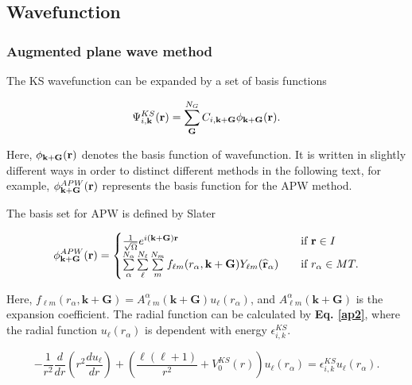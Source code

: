 \documentclass[a4paper, 12pt, titlepage,oneside,drop]{kthesis}
\begin{document}
\subsection{Wavefunction}
\subsubsection{Augmented plane wave method}

The KS wavefunction can be expanded by a set of basis functions 

\begin{equation}\label{wavefunctions}
 \Psi^{KS}_{i,\textbf{k}}(\textbf{r}) = \sum\limits_{\textbf{G}}^{N_G} C_{i,\textbf{k}+\textbf{G}}\phi_{\textbf {k}+\textbf{G}} ({\textbf r}).
\end{equation}

Here, $\phi_{\textbf {k}+\textbf{G}} ({\textbf r})$ denotes the basis function of wavefunction. It is written in slightly different ways in order to distinct different methods in the following text, for example, 
$\phi^{APW}_{\textbf {k}+\textbf{G}}({\textbf r})$ represents the basis function for the APW method.

The basis set for APW is defined by Slater \cite{slater1937wave,loucks1967augmented}

\begin{equation}\label{ap111}
\phi^{APW}_{\textbf {k}+\textbf{G}} ({\textbf r}) = 
\begin{cases} \frac {1}{\sqrt{\Omega}} e^{i({ \textbf {k}+\textbf{G}}) {\textbf r}} & \quad \mbox{if ${\textbf r} \in I $} 
\\
\sum\limits_{\alpha}^{N_{\alpha}} \sum\limits_{{\ell}}^{N_{\ell}} \sum\limits_{{m}}^{N_{m}} f_{{\ell}{m}} (r_{\alpha},{\textbf {k}+\textbf{G}}) Y_{{\ell}m}(\widehat{{\textbf r}}_{\alpha})  & \quad \mbox{if $ r_{\alpha} \in MT. $}\\ 
\end{cases}
\end{equation}

Here, $f_{{\ell}{m}} (r_{\alpha},\textbf{k}+\textbf{G}) =  A _{{\ell}m}^{\alpha} ( \textbf {k}+\textbf{G}) u_{{\ell}}(r_{\alpha})$, and $A _{{\ell}m}^{\alpha} (\textbf {k}+\textbf{G}) $ is the 
expansion coefficient. The radial function can be calculated by \textbf{Eq. \ref{ap2}}, where the radial function $u_{{\ell}} (r_{\alpha})$ is dependent with energy $\epsilon_{i,k}^{KS}$.

\begin{equation}\label{ap2}
-\frac{1}{r^2}  \frac{d}{dr} (r^2 \frac{du_{\ell}}{dr})+ \left(\frac{\ell(\ell+1)}{r^2}+V^{KS}_0({r})\right)u_{\ell}(r_{\alpha}) = \epsilon_{i,k}^{KS} u_{\ell}(r_{\alpha}).
\end{equation}
\end{document}

